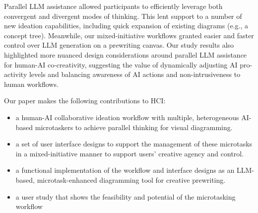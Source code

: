 Parallel LLM assistance allowed participants to efficiently leverage both convergent and divergent modes of thinking.
This lent support to a number of new ideation capabilities, including quick expansion of existing diagrams (e.g., a concept tree).
Meanwhile, our mixed-initiative workflows granted easier and faster control over LLM generation on a prewriting canvas.
Our study results also highlighted more nuanced design considerations around parallel LLM assistance for human-AI co-creativity, suggesting the value of dynamically adjusting AI pro-activity levels and balancing awareness of AI actions and non-intrusiveness to human workflows.   


Our paper makes the following contributions to HCI:
\begin{itemize}[topsep=0pt]
\item a human-AI collaborative ideation workflow with multiple, heterogeneous AI-based microtaskers to achieve parallel thinking for visual diagramming.
\item a set of user interface designs to support the management of these microtasks in a mixed-initiative manner to support users' creative agency and control.
\item a functional implementation of the workflow and  interface designs as an LLM-based, microtask-enhanced diagramming tool for creative prewriting.
\item a user study that shows the feasibility and potential of the microtasking workflow
\end{itemize}

